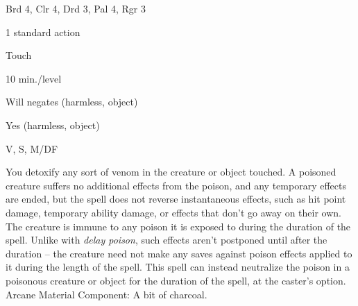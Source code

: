 
\begin{description*}
\item[Level:] Brd 4, Clr 4, Drd 3, Pal 4, Rgr 3
\item[Casting Time:] 1 standard action
\item[Range:] Touch
\item[Duration:] 10 min./level
\item[Saving Throw:] Will negates (harmless, object)
\item[Spell Resistance:] Yes (harmless, object)
\item[Components:] V, S, M/DF
\end{description*}

You detoxify any sort of venom in the creature or object touched. A poisoned creature
suffers no additional effects from the poison, and any temporary effects are ended,
but the spell does not reverse instantaneous effects, such as hit point damage,
temporary ability damage, or effects that don't go away on their own.
The creature is immune to any poison it is exposed to during the duration of the
spell. Unlike with \textit{delay poison}, such effects aren't postponed until after
the duration  -- the creature need not make any saves against poison effects applied
to it during the length of the spell.
This spell can instead neutralize the poison in a poisonous creature or object
for the duration of the spell, at the caster's option.
Arcane Material Component: A bit of charcoal.